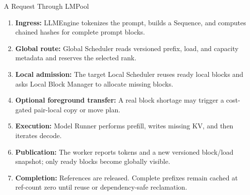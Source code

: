 \documentclass[aspectratio=169,10pt]{beamer}
\newcommand{\sys}{LMPool}
\newcommand{\metric}[1]{\textcolor{LMBlue}{\bfseries #1}}
\begin{document}
\begin{frame}{A Request Through \sys{}}
  \small
  \begin{enumerate}
    \item \metric{Ingress:} LLMEngine tokenizes the prompt, builds a Sequence, and computes chained hashes for complete prompt blocks.
    \item \metric{Global route:} Global Scheduler reads versioned prefix, load, and capacity metadata and reserves the selected rank.
    \item \metric{Local admission:} The target Local Scheduler reuses ready local blocks and asks Local Block Manager to allocate missing blocks.
    \item \metric{Optional foreground transfer:} A real block shortage may trigger a cost-gated pair-local copy or move plan.
    \item \metric{Execution:} Model Runner performs prefill, writes missing KV, and then iterates decode.
    \item \metric{Publication:} The worker reports tokens and a new versioned block/load snapshot; only ready blocks become globally visible.
    \item \metric{Completion:} References are released. Complete prefixes remain cached at ref-count zero until reuse or dependency-safe reclamation.
  \end{enumerate}
\end{frame}
\end{document}
